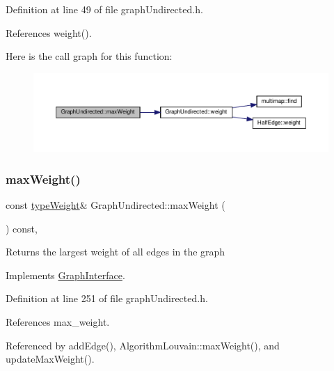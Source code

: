 Definition at line 49 of file graph\+Undirected.\+h.



References weight().

Here is the call graph for this function\+:\nopagebreak
\begin{figure}[H]
\begin{center}
\leavevmode
\includegraphics[width=350pt]{classGraphUndirected_a99cc719c89bd4afb612cdae920939a00_cgraph}
\end{center}
\end{figure}
\mbox{\label{classGraphUndirected_a7c21f40748eef95d1c35be892ab10ce2}} 
\subsubsection{\texorpdfstring{max\+Weight()}{maxWeight()}\hspace{0.1cm}{\footnotesize\ttfamily [2/2]}}
{\footnotesize\ttfamily const \hyperlink{edge_8h_a2e7ea3be891ac8b52f749ec73fee6dd2}{type\+Weight}\& Graph\+Undirected\+::max\+Weight (\begin{DoxyParamCaption}{ }\end{DoxyParamCaption}) const\hspace{0.3cm}{\ttfamily [inline]}, {\ttfamily [virtual]}}

\begin{DoxyReturn}{Returns}
the largest weight of all edges in the graph 
\end{DoxyReturn}


Implements \hyperlink{classGraphInterface_a2fb0681f6cda5f8318adf7ee95df3685}{Graph\+Interface}.



Definition at line 251 of file graph\+Undirected.\+h.



References max\+\_\+weight.



Referenced by add\+Edge(), Algorithm\+Louvain\+::max\+Weight(), and update\+Max\+Weight().

